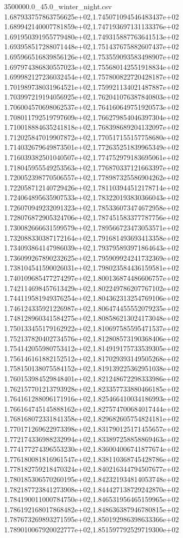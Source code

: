 \begin{filecontents*}{3500000.0_45.0_winter_night.csv}
1.687933757863756625e+02,1.745071094546483437e+02
1.689942140007781859e+02,1.747193697131133376e+02
1.691950391955779480e+02,1.749315887763641513e+02
1.693958517288071448e+02,1.751437675882607437e+02
1.695966516839856126e+02,1.753559093583498907e+02
1.697974386830557023e+02,1.755680142551918834e+02
1.699982127236032454e+02,1.757800822720428187e+02
1.701989738031964521e+02,1.759921134021487887e+02
1.703997219194056925e+02,1.762041076387840803e+02
1.706004570698062537e+02,1.764160649751920573e+02
1.708011792519797609e+02,1.766279854046397304e+02
1.710018884635241818e+02,1.768398689204132097e+02
1.712025847019907872e+02,1.770517155157758680e+02
1.714032679649873501e+02,1.772635251839965349e+02
1.716039382501040507e+02,1.774752979183695061e+02
1.718045955549253563e+02,1.776870337121663397e+02
1.720052398770506557e+02,1.778987325586904262e+02
1.722058712140729426e+02,1.781103944512178714e+02
1.724064895635907533e+02,1.783220193830366043e+02
1.726070949232091323e+02,1.785336073474672958e+02
1.728076872905324706e+02,1.787451583377787756e+02
1.730082666631599579e+02,1.789566723473053571e+02
1.732088330387172164e+02,1.791681493693413358e+02
1.734093864147986039e+02,1.793795893971864643e+02
1.736099267890232625e+02,1.795909924241732369e+02
1.738104541590026031e+02,1.798023584436159581e+02
1.740109685477274297e+02,1.800136874486606757e+02
1.742114698457613429e+02,1.802249786207767102e+02
1.744119581949376254e+02,1.804362313254769106e+02
1.746124335921226987e+02,1.806474455552079235e+02
1.748128960341584275e+02,1.808586213024173048e+02
1.750133455179162922e+02,1.810697585595471537e+02
1.752137820402734576e+02,1.812808573190368406e+02
1.754142055980753412e+02,1.814919175733539305e+02
1.756146161882152512e+02,1.817029393149505268e+02
1.758150138075584152e+02,1.819139225362951038e+02
1.760153984529848401e+02,1.821248672298333986e+02
1.762157701213793928e+02,1.823357733880466185e+02
1.764161288096171916e+02,1.825466410034186993e+02
1.766164745145888162e+02,1.827574700684017444e+02
1.768168072331841358e+02,1.829682605754824181e+02
1.770171269622973398e+02,1.831790125171455657e+02
1.772174336988232994e+02,1.833897258858869463e+02
1.774177274396553230e+02,1.836004006741877674e+02
1.776180081816961547e+02,1.838110368745428786e+02
1.778182759218470324e+02,1.840216344794507677e+02
1.780185306570260195e+02,1.842321934814053748e+02
1.782187723841273908e+02,1.844427138729242870e+02
1.784190011000784750e+02,1.846531956465159965e+02
1.786192168017868482e+02,1.848636387946780815e+02
1.787673269893271595e+02,1.850192986398633366e+02
1.789010067920022777e+02,1.851597792529719300e+02

\end{filecontents*}
